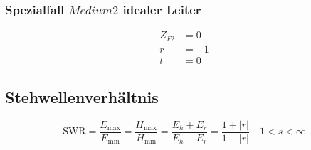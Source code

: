 \subsubsection{Spezialfall $\underline{Medium 2}$ idealer Leiter}
\begin{align*}
    Z_{F2} &= 0\\
    r &= -1\\
    t &= 0
\end{align*}

\subsection{Stehwellenverhältnis}
\[
    \mathrm{SWR} = \frac{E_{\max}}{E_{\min}}=\frac{H_{\max}}{H_{\min}}=\frac{E_{h}+E_{r}}{E_{h}-E_{r}} = \frac{1+|r|}{1-|r|} \quad 1<s<\infty
\]
